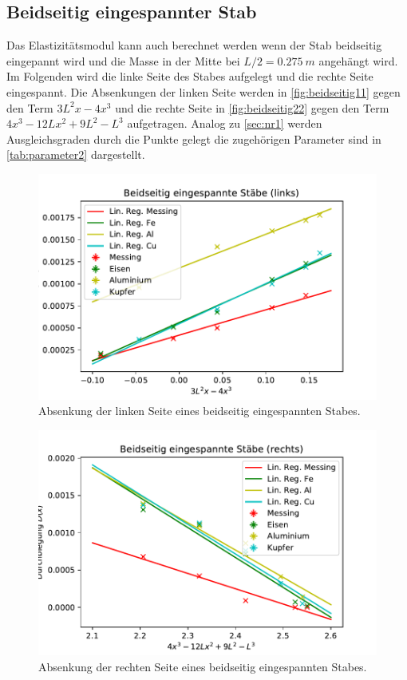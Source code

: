 \subsection{Beidseitig eingespannter Stab}
\label{sec:nr2}
Das Elastizitätsmodul kann auch berechnet werden wenn der Stab beidseitig eingepannt wird und die 
Masse in der Mitte bei $L/2=\SI[]{0.275}[]{m}$ angehängt wird. Im Folgenden wird die linke Seite des Stabes aufgelegt und
die rechte Seite eingespannt. Die Absenkungen der linken Seite werden in \autoref{fig:beidseitig11} gegen den Term
$3L^2x-4x^3$ und die rechte Seite in \autoref{fig:beidseitig22} gegen den Term $4x^3-12Lx^2+9L^2-L^3$ aufgetragen.
Analog zu \autoref{sec:nr1} werden Ausgleichsgraden durch die Punkte gelegt die zugehörigen Parameter sind in
\autoref{tab:parameter2} dargestellt.
\begin{figure}
    \centering
    \includegraphics{beidseitig1.pdf}
    \caption{Absenkung der linken Seite eines beidseitig eingespannten Stabes.}
    \label{fig:beidseitig11}
  \end{figure}
  \begin{figure}
    \centering
    \includegraphics{beidseitig2.pdf}
    \caption{Absenkung der rechten Seite eines beidseitig eingespannten Stabes.}
    \label{fig:beidseitig22}
  \end{figure}

